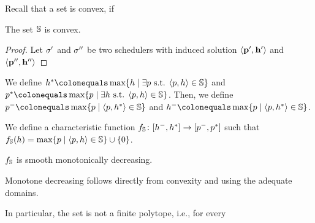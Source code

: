 {{{Recall that a set is convex, if 
\begin{proposition}
	The set $\mathbb{S}$ is convex. 
\end{proposition}
\begin{proof}
Let $\sigma'$ and $\sigma''$ be two schedulers with induced solution $\langle \mathbf{p}', \mathbf{h}' \rangle$ and $\langle \mathbf{p}'', \mathbf{h}'' \rangle$ 	
\end{proof}

\begin{definition}
We define 
$\rndopt \colonequals \max \{ \rndp \mid \exists \scp \text{ s.t. } \langle \scp, \rndp \rangle \in \solutions  \} $
and 
$\scopt \colonequals \max \{ \scp \mid \exists \rndp \text{ s.t. } \langle \scp, \rndp \rangle \in \solutions  \} $.
Then, we define 
$\scmin \colonequals \max \{ \scp \mid \langle \scp, \rndopt \rangle  \in \solutions \}$ and $\rndmin \colonequals \max \{ \scp \mid \langle \scp, \rndopt \rangle  \in \solutions \}$.
\end{definition}




We define a characteristic function $f_\mathbb{S}\colon [h^{-},h^{*}] \rightarrow [p^{-},p^{*}]$ such that $f_\mathbb{S}(h) = \max \{ p \mid \langle p, h \rangle \in \mathbb{S} \} \cup \{ 0 \}$.  
\begin{proposition}
	$f_\mathbb{S}$ is smooth monotonically decreasing. 
\end{proposition}
Monotone decreasing follows directly from convexity and using the adequate domains. 
\color{red}{how do we know smooth and continuous?}

In particular, the set is not a finite polytope, i.e., for every 


 
\begin{figure}
\centering
\begin{subfigure}{0.2\columnwidth}
\centering
{}
\end{subfigure}
\end{figure}}}}

